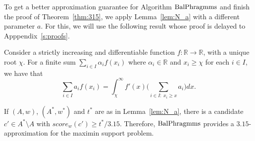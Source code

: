 To get a better approximation guarantee for Algorithm $\operatorname{BalPhragmms}$ and finish the proof of Theorem~\ref{thm:315}, we apply Lemma~\ref{lem:N_a} with a different parameter $a$. For this, we will use the following result whose proof is delayed to Apppendix~\ref{s:proofs}.

\begin{lemma}\label{lem:Lebesgue}
Consider a strictly increasing and differentiable function $f:\mathbb{R}\rightarrow \mathbb{R}$, with a unique root $\chi$. For a finite sum $\sum_{i\in I} \alpha_i f(x_i)$ where $\alpha_i\in\mathbb{R}$ and $ x_i\geq \chi$ for each $i\in I$, we have that
$$\sum_{i\in I} a_i f(x_i) = \int_{\chi}^{\infty} f'(x) \big(\sum_{i\in I: \ x_i\geq x} a_i\big)dx.$$
\end{lemma}

\begin{lemma}\label{lem:candidate315}
If $(A,w)$, $(A^*,w^*)$ and $t^*$ are as in Lemma~\ref{lem:N_a}, there is a candidate $c'\in A^*\setminus A$ with $score_w(c')\geq t^*/3.15$. Therefore, $\operatorname{BalPhragmms}$ provides a $3.15$-approximation for the maximin support problem.
\end{lemma}

